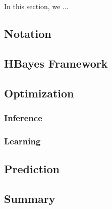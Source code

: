 In this section, we ...

\subsection{Notation}


\subsection{HBayes Framework}

\subsection{Optimization}

\subsubsection{Inference}

\subsubsection{Learning}

\subsection{Prediction}

\subsection{Summary}